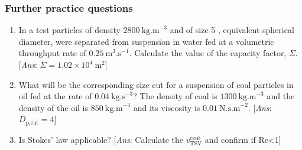 \begin{frame}\frametitle{Further practice questions}
	\begin{enumerate}
		\item	In a test particles of density $2800~\text{kg.m}^{-3}$ and of size 5 \micron, equivalent spherical diameter, were separated from suspension in water fed at a volumetric throughput rate of $0.25~\text{m}^{3}\text{.s}^{-1}$. Calculate the value of the capacity factor, $\Sigma$. {\color{myOrange}\tiny{[\emph{Ans}: $\Sigma = 1.02 \times 10^4~\text{m}^2$]}}
		
		\vspace{12pt}
		\item	What will be the corresponding size cut for a suspension of coal particles in oil fed at the rate of $0.04~\text{kg.s}^{-3}$? The density of coal is $1300~\text{kg.m}^{-3}$ and the density of the oil is $850~\text{kg.m}^{-3}$ and its viscosity is $0.01~\text{N.s.m}^{-2}$. {\color{myOrange}\tiny{[\emph{Ans}: $D_\text{p,cut} = 4$\micron]}}
		
		\vspace{12pt}
		\item	Is Stokes' law applicable?  {\color{myOrange}\tiny{[\emph{Ans}: Calculate the $v_\text{TSV}^\text{cent}$ and confirm if Re<1]}}
	\end{enumerate}
\end{frame}
